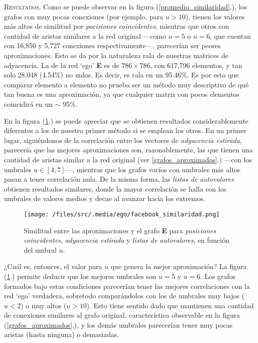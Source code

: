 \vspace{1em}
\noindent \textsc{Resultados}. Como se puede observar en la figura (\ref{promedio_similaridad}.), los grafos con muy pocas conexiones (por ejemplo, para $u > 10$), tienen los valores más altos de similitud por \textit{pocisiones coincidentes}, mientras que otros con cantidad de aristas similares a la red original ---como $u = 5$ o $u = 6$, que cuentan con 16,850 y 5,727 conexiones respectivamente---, parecerían ser peores aproximaciones. Esto se da por la naturaleza rala de nuestras matrices de adyacencia. La de la red `ego' \textbf{E} es de $786 \times 786$, con 617,796 elementos, y tan solo 28,048 (4.54\%) no nulos. Es decir, es rala en un 95.46\%. Es por esto que comparar elemento a elemento no prueba ser un método muy descriptivo de qué tan buena es una aproximación, ya que cualquier matriz con pocos elementos coincidirá en un $\sim$ 95\%.

\vspace{1em}
En la figura (\ref{grafo_correlaciones}.) se puede apreciar que se obtienen resultados considerablemente diferentes a los de nuestro primer método si se emplean los otros. En un primer lugar, siguiéndonos de la correlación entre los vectores de \textit{adyacencia estirada}, parecería que las mejores aproximaciones son, razonablemente, las que tienen una cantidad de aristas similar a la red original (ver \ref{grafos_aproximados}.) ---con los umbrales $u \in [4,7]$---, mientras que los grafos vacíos con umbrales más altos pasan a tener correlación nula. De la misma forma, las \textit{listas de autovalores} obtienen resultados similares, donde la mayor correlación se halla con los umbrales de valores medios y decae al avanzar hacia los extremos.  


\begin{figure}[!htbp]
\centering
\texttt{[image: /files/src/.media/ego/facebook\_similaridad.png]}
\caption{Similitud entre las aproximaciones y el grafo \textbf{E} para \textit{posiciones coincidentes}, \textit{adyacencia estirada} y \textit{listas de autovalores}, en función del umbral $u$.}
\label{grafo_correlaciones}
\end{figure}

\vspace{1em}
¿Cuál es, entonces, el valor para $u$ que genera la mejor aproximación? 
La figura (\ref{grafo_correlaciones}.) permite deducir que los mejores umbrales son $u = 5$ y $u = 6$. Los grafos formados bajo estas condiciones parecerían tener las mejores correlaciones con la red `ego' verdadera, sobretodo comparándolos con los de umbrales muy bajos ($u < 2$) o muy altos ($u > 10$). Esto tiene sentido dado que mantienen una cantidad de conexiones similares al grafo original, característica observable en la figura (\ref{grafos_aproximados}.), y los demás umbrales parecerían tener muy pocas aristas (hasta ninguna) o demasiadas.

